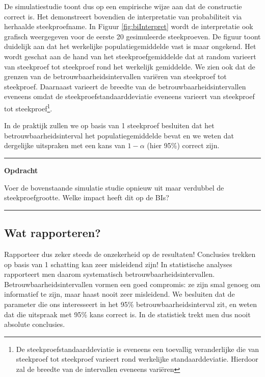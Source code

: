 \documentclass[
  12pt,dutch]{book}
\theoremstyle{definition}
\theoremstyle{definition}
\theoremstyle{definition}
\theoremstyle{definition}
\theoremstyle{remark}
\begin{document}
De simulatiestudie toont dus op een empirische wijze aan dat de constructie correct is.
Het demonstreert bovendien de interpretatie van probabiliteit via herhaalde steekproefname.
In Figuur \ref{fig:biInterpret} wordt de interpretatie ook grafisch weergegeven voor de eerste 20 gesimuleerde steekproeven. De figuur toont duidelijk aan dat het werkelijke populatiegemiddelde vast is maar ongekend. Het wordt geschat aan de hand van het steekproefgemiddelde dat at random varieert van steekproef tot steekproef rond het werkelijk gemiddelde.
We zien ook dat de grenzen van de betrouwbaarheidsintervallen variëren van steekproef tot steekproef.
Daarnaast varieert de breedte van de betrouwbaarheidsintervallen eveneens omdat de steekproefstandaarddeviatie eveneens varieert van steekproef tot steekproef\footnote{De steekproefstandaarddeviatie is eveneens een toevallig veranderlijke die van steekproef tot steekproef varieert rond werkelijke standaarddeviatie. Hierdoor zal de breedte van de intervallen eveneens variëren}.

In de praktijk zullen we op basis van 1 steekproef besluiten dat het betrouwbaarheidsinterval het populatiegemiddelde bevat en we weten dat dergelijke uitspraken met een kans van \(1-\alpha\) (hier 95\%) correct zijn.

\begin{center}\rule{0.5\linewidth}{0.5pt}\end{center}

\textbf{Opdracht}

Voer de bovenstaande simulatie studie opnieuw uit maar verdubbel de steekproefgrootte. Welke impact heeft dit op de BIs?

\begin{center}\rule{0.5\linewidth}{0.5pt}\end{center}

\subsection{Wat rapporteren?}\label{wat-rapporteren}

Rapporteer dus zeker steeds de onzekerheid op de resultaten! Conclusies trekken op basis van 1 schatting kan zeer misleidend zijn! In statistische analyses rapporteert men daarom systematisch betrouwbaarheidsintervallen.
Betrouwbaarheidsintervallen vormen een goed compromis: ze zijn smal genoeg om informatief te zijn, maar haast nooit zeer misleidend. We besluiten dat de parameter die ons interesseert in het 95\% betrouwbaarheidsinterval zit,
en weten dat die uitspraak met 95\% kans correct is.
In de statistiek trekt men dus nooit absolute conclusies.
\end{document}
